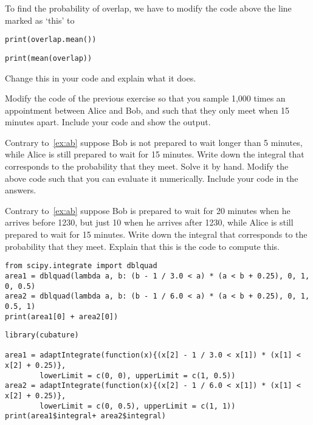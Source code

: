 \begin{exercise}
To find the probability of overlap, we have to modify the code above the line marked as `this' to
\begin{verbatim}
print(overlap.mean())
\end{verbatim}

\begin{verbatim}
print(mean(overlap))
\end{verbatim}

Change this in your code and explain what it does.
\end{exercise}


\begin{exercise}
Modify the  code of the previous exercise so that you sample 1,000 times an appointment between Alice and Bob, and such that they only meet when 15 minutes apart. Include your code and show the output.
\end{exercise}


\begin{exercise}
Contrary to~\cref{ex:ab} suppose Bob is not prepared to wait longer than 5 minutes, while Alice is still prepared to wait for 15 minutes. Write down the integral that corresponds to the probability that they meet.  Solve it by hand. Modify the above code such that you can evaluate it numerically. Include your code in the answers.
\end{exercise}

\begin{exercise}
Contrary to~\cref{ex:ab} suppose Bob is prepared to wait for 20 minutes when he arrives before 1230, but just 10 when he arrives after 1230, while Alice is still prepared to wait for 15 minutes. Write down the integral that corresponds to the probability that they meet. Explain that this is the code to compute this.

\begin{verbatim}
from scipy.integrate import dblquad
area1 = dblquad(lambda a, b: (b - 1 / 3.0 < a) * (a < b + 0.25), 0, 1, 0, 0.5)
area2 = dblquad(lambda a, b: (b - 1 / 6.0 < a) * (a < b + 0.25), 0, 1, 0.5, 1)
print(area1[0] + area2[0])
\end{verbatim}

\begin{verbatim}
library(cubature)

area1 = adaptIntegrate(function(x){(x[2] - 1 / 3.0 < x[1]) * (x[1] < x[2] + 0.25)},
        lowerLimit = c(0, 0), upperLimit = c(1, 0.5))
area2 = adaptIntegrate(function(x){(x[2] - 1 / 6.0 < x[1]) * (x[1] < x[2] + 0.25)},
        lowerLimit = c(0, 0.5), upperLimit = c(1, 1))
print(area1$integral+ area2$integral)
\end{verbatim}

\end{exercise}

